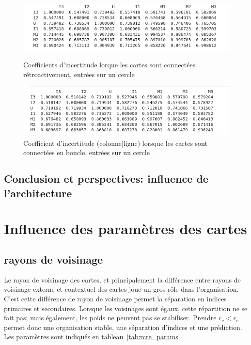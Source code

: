 \begin{figure}
\begin{minipage}{0.45\textwidth}
\includegraphics[width=\textwidth]{3som_cercle_im}
\caption{Coefficients d'incertitude lorque les cartes sont connectées rétroactivement, entrées sur un cercle}
\end{minipage}
\hfill
\begin{minipage}{0.45\textwidth}
\centering
\includegraphics[width=\textwidth]{3som_loop_im.png}
\caption{Coefficient d'incertitude (colonne|ligne) lorsque les cartes sont connectées en boucle, entrées sur un cercle}
\end{minipage}
\end{figure}


\subsection{Conclusion et perspectives: influence de l'architecture}

\section{Influence des paramètres des cartes}

\subsection{rayons de voisinage}
Le rayon de voisinage des cartes, et principalement la différence entre rayons de voisinage externe et contextuel des cartes joue un gros rôle dans l'organisation. C'est cette différence de rayon de voisinage permet la séparation en indices primaires et secondaires. Lorsque les voisinages sont égaux, cette répartition ne se fait pas; mais également, les poids ne peuvent pas se stabiliser. Prendre $r_c < r_e$ permet donc une organisation stable, une séparation d'indices et une prédiction. Les paramètres sont indiqués en tableau~\ref{tab:rcre_params}.

